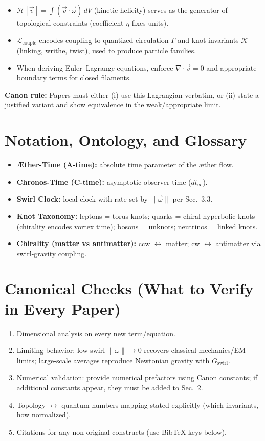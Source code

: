 \documentclass[11pt]{article}
\begin{document}
\begin{itemize}
    \item $\mathcal{H}[\vec v] = \int (\vec v\cdot\vec\omega)\,dV$ (kinetic helicity) serves as the generator of topological constraints (coefficient $\eta$ fixes units).
    \item $\mathcal{L}_{\text{couple}}$ encodes coupling to quantized circulation $\Gamma$ and knot invariants $\mathcal{K}$ (linking, writhe, twist), used to produce particle families.
    \item When deriving Euler–Lagrange equations, enforce $\nabla\cdot\vec v=0$ and appropriate boundary terms for closed filaments.
\end{itemize}

\textbf{Canon rule:} Papers must either (i) use this Lagrangian verbatim, or (ii) state a justified variant and show equivalence in the weak/appropriate limit.

\section{Notation, Ontology, and Glossary}

\begin{itemize}
    \item \textbf{Æther-Time (A-time):} absolute time parameter of the æther flow.
    \item \textbf{Chronos-Time (C-time):} asymptotic observer time ($dt_{\infty}$).
    \item \textbf{Swirl Clock:} local clock with rate set by $\lVert\vec\omega\rVert$ per Sec.~3.3.
    \item \textbf{Knot Taxonomy:} leptons = torus knots; quarks = chiral hyperbolic knots (chirality encodes vortex time); bosons = unknots; neutrinos = linked knots.
    \item \textbf{Chirality (matter vs antimatter):} ccw $\leftrightarrow$ matter; cw $\leftrightarrow$ antimatter via swirl-gravity coupling.
\end{itemize}

\section{Canonical Checks (What to Verify in Every Paper)}

\begin{enumerate}
    \item Dimensional analysis on every new term/equation.
    \item Limiting behavior: low-swirl $\lVert\omega\rVert\to 0$ recovers classical mechanics/EM limits; large-scale averages reproduce Newtonian gravity with $G_{\text{swirl}}$.
    \item Numerical validation: provide numerical prefactors using Canon constants; if additional constants appear, they must be added to Sec.~2.
    \item Topology $\leftrightarrow$ quantum numbers mapping stated explicitly (which invariants, how normalized).
    \item Citations for any non-original constructs (use BibTeX keys below).
\end{enumerate}
\end{document}
